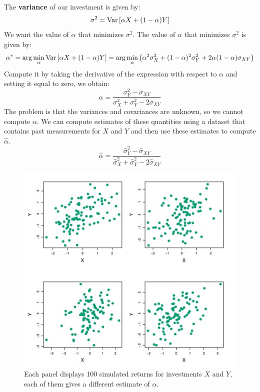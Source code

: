 The \textbf{variance} of our investment is given by:
\[
    \sigma^2 = \text{Var}\left[\alpha X + (1-\alpha)Y\right]
\]
We want the value of $\alpha$ that minimizes $\sigma^2$. The value of $\alpha$ that minimizes $\sigma^2$ is given by:
\[
    \alpha^\ast  = \arg\min_{\alpha} \text{Var}\left[\alpha X + (1-\alpha)Y\right] = \arg\min_{\alpha} \left(\alpha^2 \sigma^2_X + (1-\alpha)^2 \sigma^2_Y + 2\alpha(1-\alpha)\sigma_{XY}\right)
\]
Compute it by taking the derivative of the expression with respect to $\alpha$ and setting it equal to zero, we obtain: %
\[
    \alpha = \frac{\sigma^2_Y - \sigma_{XY}}{\sigma^2_X + \sigma^2_Y - 2\sigma_{XY}}
\]
The problem is that the variances and covariances are unknown, so we cannot compute $\alpha$. We can compute estimates of these quantities using a dataset that contains past measurements for $X$ and $Y$ and then use these estimates to compute $\hat{\alpha}$.
\[
    \hat\alpha = \frac{\hat\sigma^2_Y - \hat\sigma_{XY}}{\hat\sigma^2_X + \hat\sigma^2_Y - 2\hat\sigma_{XY}}
\]
\begin{figure}[ht]
    \centering
    \includegraphics[width=0.8\linewidth]{./figures/chapter_4/lec_15_investment_simulations.png}
    \caption{Each panel displays 100 simulated returns for investments $X$ and $Y$, each of them gives a different estimate of $\alpha$.}
    \label{fig:lec_15_bootstrap_example}
\end{figure}

